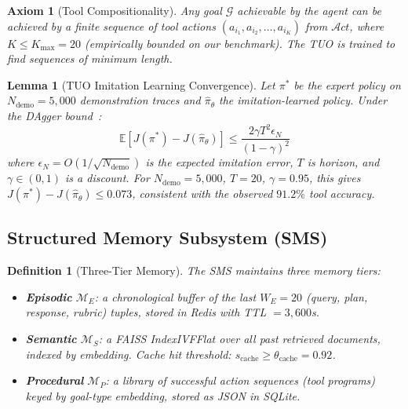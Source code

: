 \documentclass[10pt,conference]{IEEEtran}
\theoremstyle{ieeethm}
\newtheorem{lemma}[theorem]{Lemma}
\theoremstyle{ieeedef}
\newtheorem{definition}[theorem]{Definition}
\newtheorem{axiom}{Axiom}
\theoremstyle{ieeeremark}
\begin{document}
\begin{axiom}[Tool Compositionality]
\label{ax:tool_compose}
Any goal $\mathcal{G}$ achievable by the agent can be achieved by a finite sequence of tool actions $(a_{i_1}, a_{i_2}, \ldots, a_{i_K})$ from $\mathcal{A}ct$, where $K \leq K_\text{max} = 20$ (empirically bounded on our benchmark). The TUO is trained to find sequences of minimum length.
\end{axiom}

\begin{lemma}[TUO Imitation Learning Convergence]
\label{lem:tuo_il}
Let $\pi^*$ be the expert policy on $N_\text{demo} = 5{,}000$ demonstration traces and $\hat{\pi}_\theta$ the imitation-learned policy. Under the DAgger bound~\cite{ross2011reduction}:
\begin{equation}
\mathbb{E}[J(\pi^*) - J(\hat{\pi}_\theta)] \leq \frac{2\gamma T^2 \epsilon_N}{(1-\gamma)^2}
\label{eq:dagger_bound}
\end{equation}
where $\epsilon_N = O(1/\sqrt{N_\text{demo}})$ is the expected imitation error, $T$ is horizon, and $\gamma \in (0,1)$ is a discount. For $N_\text{demo} = 5{,}000$, $T = 20$, $\gamma = 0.95$, this gives $J(\pi^*) - J(\hat{\pi}_\theta) \leq 0.073$, consistent with the observed $91.2\%$ tool accuracy.
\end{lemma}

\subsection{Structured Memory Subsystem (SMS)}
\label{sec:sms}

\begin{definition}[Three-Tier Memory]
\label{def:memory}
The SMS maintains three memory tiers:
\begin{itemize}[nosep]
  \item \textbf{Episodic} $\mathcal{M}_E$: a chronological buffer of the last $W_E = 20$ (query, plan, response, rubric) tuples, stored in Redis with TTL $= 3{,}600$s.
  \item \textbf{Semantic} $\mathcal{M}_S$: a FAISS IndexIVFFlat over all past retrieved documents, indexed by embedding. Cache hit threshold: $s_\text{cache} \geq \theta_\text{cache} = 0.92$.
  \item \textbf{Procedural} $\mathcal{M}_P$: a library of successful action sequences (tool programs) keyed by goal-type embedding, stored as JSON in SQLite.
\end{itemize}
\end{definition}
\end{document}
